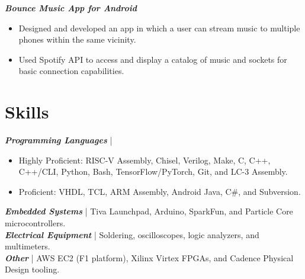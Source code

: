 \documentclass[letter]{res}
\begin{document}
\begin{resume}
\vspace{-2mm}

{\sl \textbf{Bounce Music App for Android}}\\

 \vspace{-4mm}

\begin{itemize}
 \item Designed and developed an app in which a user can stream music to multiple phones within the same vicinity.
 \item Used Spotify API to access and display a catalog of music and sockets for basic connection capabilities.
\end{itemize}

\vspace{-2mm}

\section{Skills}
{\sl \textbf{Programming Languages}} |
\begin{itemize}
 \item Highly Proficient: RISC-V Assembly, Chisel, Verilog, Make, C, C++, C++/CLI, Python, Bash, TensorFlow/PyTorch, Git, and LC-3 Assembly.
 \item Proficient: VHDL, TCL, ARM Assembly, Android Java, C\#, and Subversion.
\end{itemize}
 \vspace{-4mm}
{\sl \textbf{Embedded Systems}} | Tiva Launchpad, Arduino, SparkFun, and Particle Core microcontrollers.\\
{\sl \textbf{Electrical Equipment}} | Soldering, oscilloscopes, logic analyzers, and multimeters.\\
{\sl \textbf{Other}} | AWS EC2 (F1 platform), Xilinx Virtex FPGAs, and Cadence Physical Design tooling.\\

\vspace{-6mm}


\end{resume}
\end{document}
